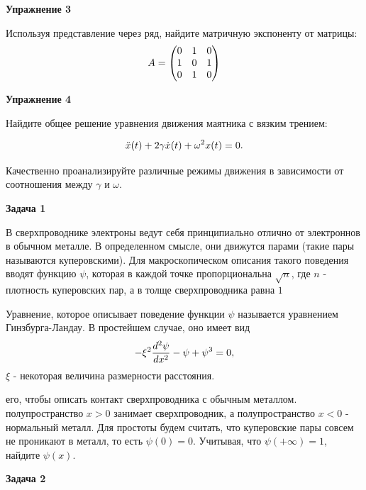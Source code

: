 \documentclass[a4paper,12pt]{article}
\begin{document}
\vspace{15pt}
\noindent \textbf{Упражнение 3}

\noindent Используя представление через ряд, найдите матричную экспоненту от матрицы:
\begin{equation}\notag
A=\begin{pmatrix}
0&1&0\\
1&0&1\\
0&1&0
\end{pmatrix}
\end{equation}

\vspace{15pt}
\noindent \textbf{Упражнение 4}

\noindent Найдите общее решение уравнения движения маятника с вязким трением:

\begin{equation}
\notag
\ddot{x}(t)+2\gamma \dot{x}(t) +\omega^2 x(t)=0.
\end{equation} 

\noindent Качественно проанализируйте различные режимы движения в зависимости от соотношения между $\gamma$ и $\omega$.

\vspace{15pt}
\noindent \textbf{Задача 1}

\noindent В сверхпроводнике электроны ведут себя принципиально отлично от электроннов в обычном металле. В определенном смысле, они движутся парами (такие пары называются куперовскими). Для макроскопическом описания такого поведения вводят функцию $\psi$, которая в каждой точке пропорциональна $\sqrt{n}$, где $n$ - плотность куперовских пар, а в толще сверхпроводника равна $1$

\noindent Уравнение, которое описывает поведение функции $\psi$ называется уравнением Гинзбурга-Ландау. В простейшем случае, оно имеет вид
\begin{equation}\notag
-\xi^{2}\frac{d^{2}\psi}{dx^{2}}-\psi+\psi^{3}	=0,
\end{equation}
 $\xi$ - некоторая величина размерности расстояния.

 его, чтобы описать контакт сверхпроводника с обычным металлом.  полупространство $x>0$ занимает сверхпроводник, а полупространство $x<0$ - нормальный металл. Для простоты будем считать, что куперовские пары совсем не проникают в металл, то есть $\psi(0)=0$. Учитывая, что $\psi(+\infty)=1$, найдите $\psi(x)$.

\vspace{15pt}
\noindent \textbf{Задача 2}
\end{document}

